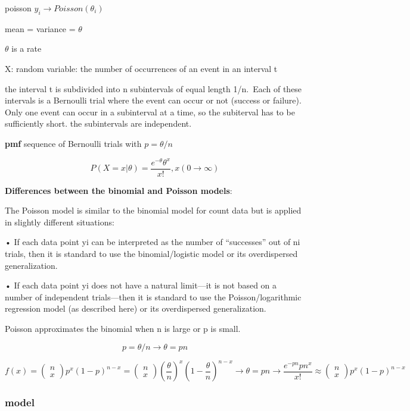 \documentclass[
]{article}
\begin{document}
poisson \(y_i \to Poisson(\theta_i)\)

mean = variance = \(\theta\)

\(\theta\) is a rate

X: random variable: the number of occurrences of an event in an interval
t

the interval t is subdivided into n subintervals of equal length
1/n.~Each of these intervals is a Bernoulli trial where the event can
occur or not (success or failure). Only one event can occur in a
subinterval at a time, so the subiterval has to be sufficiently short.
the subintervals are independent.

\textbf{pmf} sequence of Bernoulli trials with \(p=\theta/n\)

\[P(X=x|\theta)= \frac{e^{-\theta}\theta^x}{x!}, x (0 \to \infty)\]

\textbf{Differences between the binomial and Poisson models}:

The Poisson model is similar to the binomial model for count data but is
applied in slightly different situations:

• If each data point yi can be interpreted as the number of
``successes'' out of ni trials, then it is standard to use the
binomial/logistic model or its overdispersed generalization.

• If each data point yi does not have a natural limit---it is not based
on a number of independent trials---then it is standard to use the
Poisson/logarithmic regression model (as described here) or its
overdispersed generalization.

Poisson approximates the binomial when n is large or p is small.

\[p=\theta/n \to \theta = pn\]

\[f(x)= \begin{pmatrix} n\\x \end{pmatrix} p^x (1-p)^{n-x} = \begin{pmatrix} n\\x \end{pmatrix} (\frac{\theta}{n})^x (1-\frac{\theta}{n})^{n-x} \to \theta = pn \to \frac{e^{-pn}pn^x}{x!} \approx \begin{pmatrix} n\\x \end{pmatrix} p^x (1-p)^{n-x}\]

\hypertarget{model-2}{%
\subsubsection{model}\label{model-2}}
\end{document}
